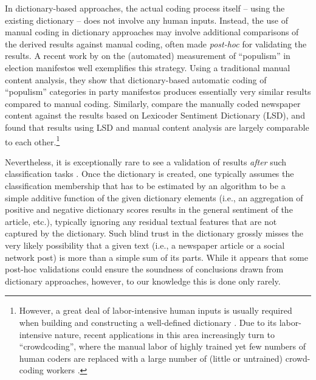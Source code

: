 \documentclass[man, floatsintext, 12pt, a4paper, noextraspace]{apa6}
\begin{document}
    In dictionary-based approaches, the actual coding process itself -- using the existing dictionary -- does not involve any human inputs. Instead, the use of manual coding in dictionary approaches may involve additional comparisons of the derived results against manual coding, often made \textit{post-hoc} for validating the results. A recent work by \textcite{Rooduijn2011} on the (automated) measurement of \enquote{populism} in election manifestos well exemplifies this strategy. Using a traditional manual content analysis, they show that dictionary-based automatic coding of \enquote{populism} categories in party manifestos produces essentially very similar results compared to manual coding. Similarly, \textcite{YoungSoroka2012} compare the manually coded newspaper content against the results based on Lexicoder Sentiment Dictionary (LSD), and found that results using LSD and manual content analysis are largely comparable to each other.\footnote{ However, a great deal of labor-intensive human inputs is usually required when building and constructing a well-defined dictionary \parencite{YoungSoroka2012, muddiman2018re}. Due to its labor-intensive nature, recent applications in this area increasingly turn to \enquote{crowdcoding}, where the manual labor of highly trained yet few numbers of human coders are replaced with a large number of (little or untrained) crowd-coding workers \parencites[][]{haselmayer2017sentiment, lind2017content}.} 
    
    Nevertheless, it is exceptionally rare to see a validation of results \textit{after} such classification tasks \parencites[yet for notable exceptions, see][]{muddiman2018re, YoungSoroka2012, gonzalez2015signals}. Once the dictionary is created, one typically assumes the classification membership that has to be estimated by an algorithm to be a simple additive function of the given dictionary elements (i.e., an aggregation of positive and negative dictionary scores results in the general sentiment of the article, etc.), typically ignoring any residual textual features that are not captured by the dictionary. Such blind trust in the dictionary grossly misses the very likely possibility that a given text (i.e., a newspaper article or a social network post) is more than a simple sum of its parts. While it appears that some post-hoc validations could ensure the soundness of conclusions drawn from dictionary approaches, however, to our knowledge this is done only rarely.
    
\end{document}
